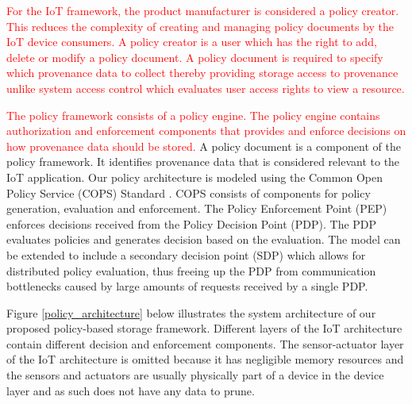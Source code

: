 \textcolor{red}{ For the IoT framework, the product manufacturer is considered a policy creator. This reduces the complexity of creating and managing policy documents by the IoT device consumers. A policy creator is a user which has the right to add, delete or modify a policy document. A policy document is required to specify which provenance data to collect thereby providing storage access to provenance unlike system access control which evaluates user access rights to view a resource. }





\par 

\textcolor{red}{The policy framework consists of a policy engine. The policy engine contains authorization and enforcement components that provides and enforce decisions on how provenance data should be stored. }A policy document is a component of the policy framework. It identifies provenance data that is considered relevant to the IoT application. Our policy architecture is modeled using the Common Open Policy Service (COPS) Standard \cite{rfc2748}. COPS consists of components for policy generation, evaluation and enforcement. The Policy Enforcement Point (PEP) enforces decisions received from the Policy Decision Point (PDP). The PDP evaluates policies and generates decision based on the evaluation. The model can be extended to include a secondary decision point (SDP) which allows for distributed policy evaluation, thus freeing up the PDP from communication bottlenecks caused by large amounts of requests received by a single PDP.  

\par Figure \ref{policy_architecture} below illustrates the system architecture of our proposed policy-based storage framework. Different layers of the IoT architecture contain different decision and enforcement components. The sensor-actuator layer of the IoT architecture is omitted because it has negligible memory resources and the  sensors and actuators are usually physically part of a device in the device layer and as such does not have any data to prune. 

